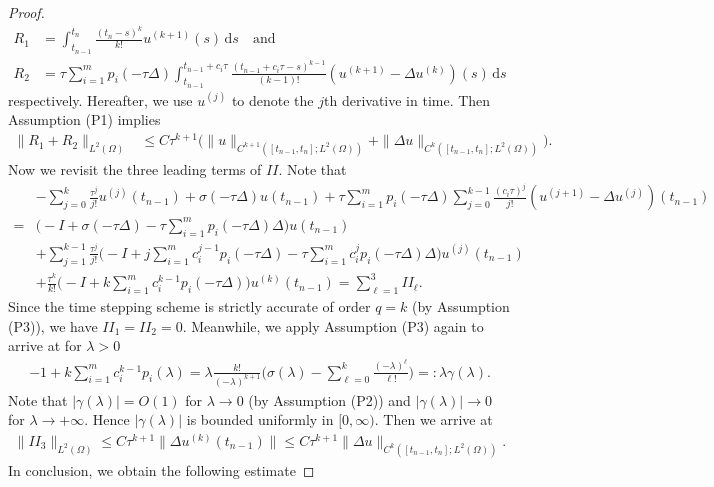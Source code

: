 \documentclass[10pt,final,leqno,onefignum,onetabnum]{siamltex}%
\def\d{\textrm{d}}
\def\d{\mathrm{d}}
\def\II{(\Omega)}
\begin{document}
\begin{proof}
\begin{align*}
 R_1 &= \int_{t_{n-1}}^{t_n} \frac{(t_n-s)^k}{k!} u^{(k+1)}(s) \,\d s\quad \text{and}\quad \\
  R_2 &=   \tau \sum_{i=1}^m p_i(-\tau \Delta) \int_{t_{n-1}}^{t_{n-1}+c_i\tau} \frac{(t_{n-1}+c_i\tau-s)^{k-1}}{(k-1)!} (u^{(k+1)}-\Delta u^{(k)})(s) \,\d s
\end{align*}
respectively. Hereafter, we use $u^{(j)}$ to denote the $j$th derivative in time. Then Assumption (P1) implies
\begin{align*}
 \|R_1+R_2\|_{L^2\II} &\le C \tau^{k+1} \Big(\|  u \|_{C^{k+1} ([t_{n-1},t_n];L^2\II)} + \|  \Delta u \|_{C^{k} ([t_{n-1},t_n];L^2\II)} \Big).
\end{align*}
Now we revisit the three leading terms of $II$. Note that
\begin{align*}
& -\sum_{j=0}^k\frac{\tau^j}{j!} u^{(j)} (t_{n-1}) + \sigma(-\tau \Delta)u(t_{n-1})
  + \tau \sum_{i=1}^m p_i(-\tau \Delta) \sum_{j=0}^{k-1} \frac{(c_i\tau)^j}{j!}
  (u^{(j+1)} - \Delta u^{(j)})(t_{n-1})\\
 =& \Big(-I +  \sigma(-\tau \Delta) - \tau \sum_{i=1}^m p_i(-\tau \Delta) \Delta \Big)u(t_{n-1}) \\
 & +   \sum_{j=1}^{k-1} \frac{\tau^j}{j!} \Big(- I  +  j \sum_{i=1}^m c_i^{j-1} p_i(-\tau \Delta) - \tau\sum_{i=1}^m c_i^{j} p_i(-\tau \Delta) \Delta\Big)u^{(j)}(t_{n-1})   \\
 & +  \frac{\tau^k}{k!} \Big(-I +  k\sum_{i=1}^m c_i^{k-1}p_i(-\tau\Delta)\Big )u^{(k)}(t_{n-1}) =\sum_{\ell=1}^3 II_\ell.
\end{align*}
Since the time stepping scheme is strictly accurate of order $q=k$ (by Assumption (P3)),
we have $ II_1=  II_2=0$. Meanwhile,
we apply Assumption (P3) again to arrive at for $\lambda>0$
\begin{align*}
  -1 + k \sum_{i=1}^m c_i^{k-1} p_i(\lambda) = \lambda \frac{k!}{(-\lambda)^{k+1}} \Big(\sigma(\lambda)-\sum_{\ell=0}^k\frac{(-\lambda)^\ell}{\ell!}\Big) =: \lambda \gamma(\lambda).
\end{align*}
Note that $|\gamma(\lambda)|=O(1)$ for $\lambda\rightarrow0$ (by Assumption (P2))
and $|\gamma(\lambda)|\rightarrow 0$ for  $\lambda\rightarrow +\infty$. Hence $|\gamma(\lambda)|$ is bounded
uniformly in $[0,\infty)$. Then we arrive at
\begin{align*}
\|  II_3 \|_{L^2\II} \le C \tau^{k+1} \|  \Delta u^{(k)}(t_{n-1}) \| \le  C \tau^{k+1} \|  \Delta u \|_{C^{k}([t_{n-1},t_n];L^2\II)}.
\end{align*}
In conclusion, we obtain the following estimate

\end{proof}
\end{document}
